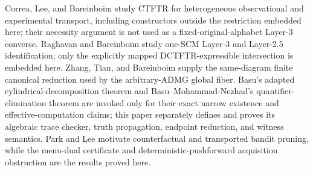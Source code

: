 Correa, Lee, and Bareinboim study CTFTR for heterogeneous observational and experimental transport, including constructors outside the restriction embedded here; their necessity argument is not used as a fixed-original-alphabet Layer-3 converse.  Raghavan and Bareinboim study one-SCM Layer-3 and Layer-2.5 identification; only the explicitly mapped DCTFTR-expressible intersection is embedded here.  Zhang, Tian, and Bareinboim supply the same-diagram finite canonical reduction used by the arbitrary-ADMG global fiber.  Basu's adapted cylindrical-decomposition theorem and Basu--Mohammad-Nezhad's quantifier-elimination theorem are invoked only for their exact narrow existence and effective-computation claims; this paper separately defines and proves its algebraic trace checker, truth propagation, endpoint reduction, and witness semantics.  Park and Lee motivate counterfactual and transported bandit pruning, while the menu-dual certificate and deterministic-pushforward acquisition obstruction are the results proved here.